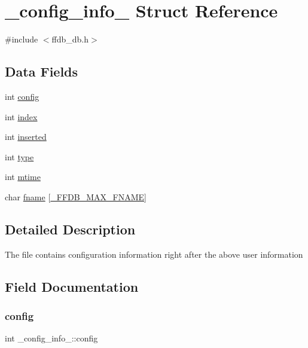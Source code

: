 \hypertarget{struct__config__info__}{}\section{\+\_\+config\+\_\+info\+\_\+ Struct Reference}
\label{struct__config__info__}


{\ttfamily \#include $<$ffdb\+\_\+db.\+h$>$}

\subsection*{Data Fields}
\begin{DoxyCompactItemize}
\item 
int \mbox{\hyperlink{struct__config__info___a09951516146d151d7fb112d8e6d834b7}{config}}
\item 
int \mbox{\hyperlink{struct__config__info___a78aa940c1f0397a3f7acfd7b2ed3a196}{index}}
\item 
int \mbox{\hyperlink{struct__config__info___a1b87a01f516bd83ef533699c6ac16c92}{inserted}}
\item 
int \mbox{\hyperlink{struct__config__info___af58415103a98083a811c0930139f13dc}{type}}
\item 
int \mbox{\hyperlink{struct__config__info___a57f55946a7e2b18f510873fac9b24a56}{mtime}}
\item 
char \mbox{\hyperlink{struct__config__info___ab1ec0b2787d132f27ac64dde75f6c3ae}{fname}} \mbox{[}\mbox{\hyperlink{adat__devel__install_2include_2ffdb__db_8h_a00ab19cd96ae7c01686ceec249b62522}{\+\_\+\+F\+F\+D\+B\+\_\+\+M\+A\+X\+\_\+\+F\+N\+A\+ME}}\mbox{]}
\end{DoxyCompactItemize}


\subsection{Detailed Description}
The file contains configuration information right after the above user information 

\subsection{Field Documentation}
\mbox{\label{struct__config__info___a09951516146d151d7fb112d8e6d834b7}} 
\subsubsection{\texorpdfstring{config}{config}}
{\footnotesize\ttfamily int \+\_\+config\+\_\+info\+\_\+\+::config}

